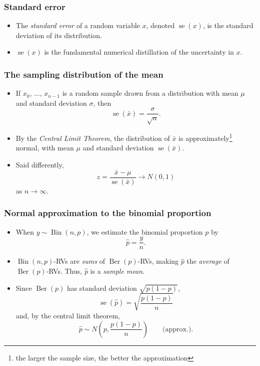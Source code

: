 \documentclass{beamer}
\DeclareMathOperator{\stderr}{se}
\DeclareMathOperator{\Ber}{Ber}
\DeclareMathOperator{\Bin}{Bin}
\begin{document}
\begin{frame}
    \frametitle{Standard error}
    
    \begin{itemize}
        \item The \emph{standard error} of a random variable $x$, denoted $\stderr(x)$, is the standard deviation of its distribution.
        \item $\stderr(x)$ is the fundamental numerical distillation of the uncertainty in $x$.
    \end{itemize}
\end{frame}
\begin{frame}
    \frametitle{The sampling distribution of the mean}

    \begin{itemize}
        \item If $x_0$, $\ldots$, $x_{n - 1}$ is a random sample drawn from
        a distribution with mean $\mu$ and standard deviation $\sigma$, then
        \[
            \stderr(\bar{x}) = \frac{\sigma}{\sqrt{n}}.
        \]
        \item By the \emph{Central Limit Theorem}, the distribution of $\bar{x}$
        is approximately\footnote{the larger the sample size, the better the approximation} normal, with mean $\mu$ and standard deviation $\stderr(\bar{x})$.

        \item Said differently,
        \[
        z = \frac{\bar{x}-\mu}{\stderr(\bar{x})}\longrightarrow N(0, 1)
        \]
        as $n\to\infty$.
    \end{itemize}
\end{frame}

\begin{frame}
    \frametitle{Normal approximation to the binomial proportion}

    \begin{itemize}
        \item When $y\sim \Bin(n, p)$, we estimate the binomial proportion $p$ by
        \[
        \hat{p} = \frac{y}{n}.
        \]

        \item $\Bin(n, p)$-RVs are \emph{sums} of $\Ber(p)$-RVs, making $\hat{p}$
        the \emph{average} of $\Ber(p)$-RVs. Thus, $\hat{p}$ is a \emph{sample mean}.
        
        \item Since $\Ber(p)$ has standard deviation $\sqrt{p(1-p)}$,
        \[
        \stderr(\hat{p}) = \sqrt{\frac{p(1-p)}{n}}
        \]
        and, by the central limit theorem,
        \[
        \hat{p}\sim N\left(p, \frac{p(1-p)}{n}\right)
        \qquad\text{(approx.)}.
        \]
    \end{itemize}
\end{frame}
\end{document}
